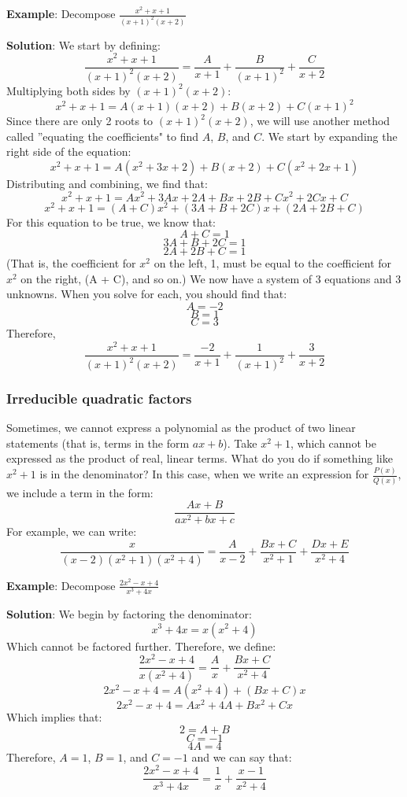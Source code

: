 \textbf{Example}: Decompose $\frac{x^2 + x + 1}{(x + 1)^2 (x + 2)}$

\textbf{Solution}: We start by defining:
$$\frac{x^2 + x + 1}{(x + 1)^2 (x + 2)} = \frac{A}{x + 1} + \frac{B}{(x + 1)^
2} + \frac{C}{x + 2}$$
Multiplying both sides by $(x + 1)^2 (x + 2)$:
$$x^2 + x + 1 = A(x + 1)(x + 2) + B(x + 2) + C(x + 1)^2$$
Since there are only 2 roots to $(x + 1)^2 (x + 2)$, we will use another 
method called ''equating the coefficients" to find $A$, $B$, and $C$. We start 
by expanding the right side of the equation:
$$x^2 + x + 1 = A(x^2 + 3x + 2) + B(x + 2) + C(x^2 + 2x + 1)$$
Distributing and combining, we find that:
$$x^2 + x + 1 = Ax^2 + 3Ax + 2A + Bx + 2B + Cx^2 + 2Cx + C$$
$$x^2 + x + 1 = (A + C)x^2 + (3A + B + 2C)x + (2A + 2B + C)$$
For this equation to be true, we know that:
$$A + C = 1$$
$$3A + B + 2C = 1$$
$$2A + 2B + C = 1$$
(That is, the coefficient for $x^2$ on the left, 1, must be equal to the 
coefficient for $x^2$ on the right, (A + C), and so on.) We now have a system 
of 3 equations and 3 unknowns. When you solve for each, you should find that:
$$A = -2$$
$$B = 1$$
$$C = 3$$
Therefore, 
$$\frac{x^2 + x + 1}{(x + 1)^2 (x + 2)} = \frac{-2}{x + 1} + \frac{1}{(x + 1)^
2} + \frac{3}{x + 2}$$

\subsubsection{Irreducible quadratic factors}
Sometimes, we cannot express a polynomial as the product of two linear 
statements (that is, terms in the form $ax + b$). Take $x^2 + 1$, which 
cannot be expressed as the product of real, linear terms. What do you do 
if something like $x^2 + 1$ is in the denominator? In this case, when we write an 
expression for $\frac{P(x)}{Q(x)}$, we include a term in the form:
$$\frac{Ax + B}{ax^2 + bx + c}$$
For example, we can write:
$$\frac{x}{(x - 2)(x^2 + 1)(x^2 + 4)} = \frac{A}{x - 2} + \frac{Bx + C}{x^2 + 1} 
+ \frac{Dx + E}{x^2 + 4}$$

\textbf{Example}: Decompose $\frac{2x^2 - x + 4}{x^3 + 4x}$

\textbf{Solution}: We begin by factoring the denominator:
$$x^3 + 4x = x(x^2 + 4)$$
Which cannot be factored further. Therefore, we define:
$$\frac{2x^2 - x + 4}{x(x^2 + 4)} = \frac{A}{x} + \frac{Bx + C}{x^2 + 4}$$
$$2x^2 - x + 4 = A(x^2 + 4) + (Bx + C)x$$
$$2x^2 - x + 4 = Ax^2 + 4A + Bx^2 + Cx$$
Which implies that:
$$2 = A + B$$
$$C = -1$$
$$4A = 4$$
Therefore, $A = 1$, $B = 1$, and $C = -1$ and we can say that:
$$\frac{2x^2 - x + 4}{x^3 + 4x} = \frac{1}{x} + \frac{x - 1}{x^2 + 4}$$

